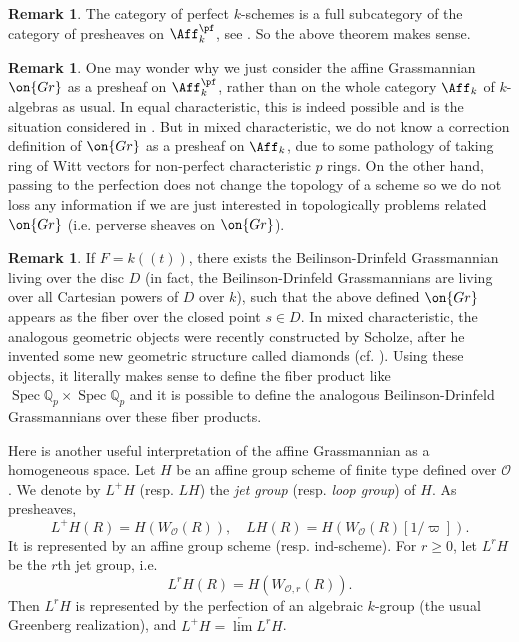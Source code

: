 \documentclass[11pt]{amsart}
\theoremstyle{definition}
\theoremstyle{definition}
\newtheorem{rmk}[thm]{Remark}
\theoremstyle{definition}
\numberwithin{equation}{subsection}
\newcommand{\bQ}{{\mathbb Q}}
\newcommand{\mO}{{\mathcal O}}
\newcommand{\Gr}{{\on{Gr}}}
\DeclareMathOperator{\Spec}{Spec}
\begin{document}
\begin{rmk}
The category of perfect $k$-schemes is a full subcategory of the category of presheaves on $\Aff_k^\pf$, see \cite[Lemma A.10]{Zh1}. So the above theorem makes sense. 
\end{rmk}
\begin{rmk}One may wonder why we just consider the affine Grassmannian $\Gr$ as a presheaf on $\Aff_k^\pf$, rather than on the whole category $\Aff_k$ of $k$-algebras as usual. In equal characteristic, this is indeed possible and is the situation considered in \cite{BL, Fa}. But
in mixed characteristic, we do not know a correction definition of  $\Gr$ as a presheaf on $\Aff_k$, due to some pathology of taking ring of Witt vectors for non-perfect characteristic $p$ rings. On the other hand, passing to the perfection does not change the topology of a scheme so we do not loss any information if we are just interested in topologically problems related $\Gr$ (i.e. perverse sheaves on $\Gr$).
\end{rmk}
\begin{rmk}
\label{R:scholzediamond}
If $F=k((t))$, there exists the Beilinson-Drinfeld Grassmannian living over the disc $D$ (in fact, the Beilinson-Drinfeld Grassmannians are living over all Cartesian powers of $D$ over $k$), such that the above defined $\Gr$ appears as the fiber over the closed point $s\in D$. In mixed characteristic, the analogous geometric objects were recently constructed by Scholze, after he invented some new geometric structure called diamonds (cf. \cite{SW}). Using these objects, it literally makes sense to define the fiber product like $\Spec \bQ_p\times \Spec \bQ_p$ and it is possible to define the analogous Beilinson-Drinfeld Grassmannians over these fiber products.
\end{rmk}

Here is another useful interpretation of the affine Grassmannian as a homogeneous space. 
Let $H$ be an affine group scheme of finite type defined over $\mO$. We denote by $L^+H$ (resp. $LH$) the \emph{jet group} (resp. \emph{loop group}) of $H$. As presheaves,
\begin{equation*}\label{E:jet and loop}
L^+H(R)=H(W_\mO(R)),\quad LH(R)=H(W_\mO(R)[1/\varpi]).
\end{equation*}
It is represented by an affine group scheme (resp. ind-scheme). For $r\geq 0$, let $L^rH$ be the $r$th jet group, i.e. 
\begin{equation*}\label{E:rjet}
L^rH(R)=H(W_{\mO,r}(R)).
\end{equation*} 
Then $L^rH$ is represented by the perfection of an algebraic $k$-group (the usual Greenberg realization), and $L^+H=\underleftarrow\lim L^rH$. 
\end{document}
